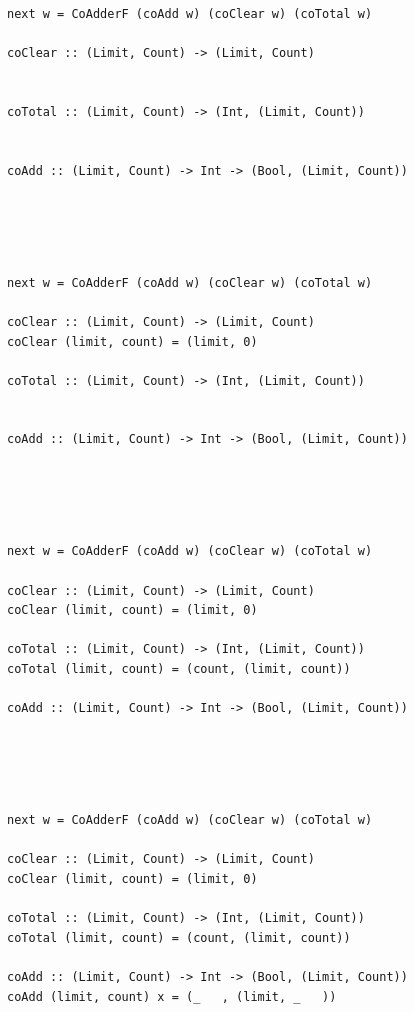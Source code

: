 \documentclass{beamer}
\begin{document}
\begin{frame}[fragile]
  \begin{overprint}
    \begin{verbatim}
next w = CoAdderF (coAdd w) (coClear w) (coTotal w)

coClear :: (Limit, Count) -> (Limit, Count)


coTotal :: (Limit, Count) -> (Int, (Limit, Count))


coAdd :: (Limit, Count) -> Int -> (Bool, (Limit, Count))





  \end{verbatim}
    \begin{verbatim}
next w = CoAdderF (coAdd w) (coClear w) (coTotal w)

coClear :: (Limit, Count) -> (Limit, Count)
coClear (limit, count) = (limit, 0)

coTotal :: (Limit, Count) -> (Int, (Limit, Count))


coAdd :: (Limit, Count) -> Int -> (Bool, (Limit, Count))





  \end{verbatim}
    \begin{verbatim}
next w = CoAdderF (coAdd w) (coClear w) (coTotal w)

coClear :: (Limit, Count) -> (Limit, Count)
coClear (limit, count) = (limit, 0)

coTotal :: (Limit, Count) -> (Int, (Limit, Count))
coTotal (limit, count) = (count, (limit, count))

coAdd :: (Limit, Count) -> Int -> (Bool, (Limit, Count))





  \end{verbatim}
    \begin{verbatim}
next w = CoAdderF (coAdd w) (coClear w) (coTotal w)

coClear :: (Limit, Count) -> (Limit, Count)
coClear (limit, count) = (limit, 0)

coTotal :: (Limit, Count) -> (Int, (Limit, Count))
coTotal (limit, count) = (count, (limit, count))

coAdd :: (Limit, Count) -> Int -> (Bool, (Limit, Count))
coAdd (limit, count) x = (_   , (limit, _   ))





\end{verbatim}
\end{overprint}
\end{frame}
\end{document}
